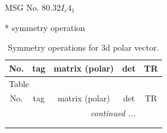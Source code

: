 \documentclass[fleqn,8pt]{jsarticle}
\begin{document}
\setcounter{MaxMatrixCols}{32}

\renewcommand{\tablename}{Table~}
\renewcommand{\figurename}{Figure~}
\begin{center}
\LARGE
MSG No. 80.32\quad$I_{c}4_{1}$
\end{center}
* symmetry operation
\renewcommand{\arraystretch}{1.3}
\begin{longtable}{ccccc}
\caption{Symmetry operations for 3d polar vector.}
 \\
 \hline \hline
No. & tag & matrix (polar) & det & TR \\ \hline \endfirsthead

\multicolumn{4}{l}{\tablename\ \thetable{}} \\
 \hline \hline
No. & tag & matrix (polar) & det & TR \\ \hline \endhead

 \hline \hline
\multicolumn{4}{r}{\footnotesize\it continued ...} \\ \endfoot

 \hline \hline
\multicolumn{4}{r}{} \\ \endlastfoot


\end{longtable}
\end{document}

